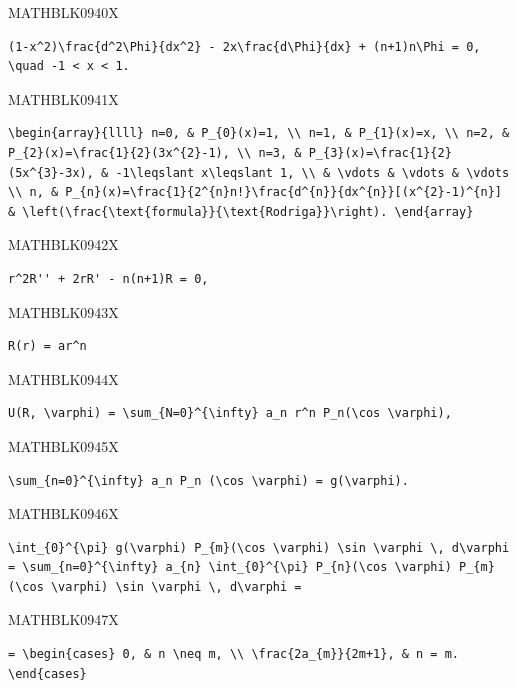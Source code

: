 \documentclass[
  ukrainian,
]{article}
\begin{document}
MATHBLK0940X

\begin{verbatim}
(1-x^2)\frac{d^2\Phi}{dx^2} - 2x\frac{d\Phi}{dx} + (n+1)n\Phi = 0, \quad -1 < x < 1.
\end{verbatim}

MATHBLK0941X

\begin{verbatim}
\begin{array}{llll} n=0, & P_{0}(x)=1, \\ n=1, & P_{1}(x)=x, \\ n=2, & P_{2}(x)=\frac{1}{2}(3x^{2}-1), \\ n=3, & P_{3}(x)=\frac{1}{2}(5x^{3}-3x), & -1\leqslant x\leqslant 1, \\ & \vdots & \vdots & \vdots \\ n, & P_{n}(x)=\frac{1}{2^{n}n!}\frac{d^{n}}{dx^{n}}[(x^{2}-1)^{n}] & \left(\frac{\text{formula}}{\text{Rodriga}}\right). \end{array}
\end{verbatim}

MATHBLK0942X

\begin{verbatim}
r^2R'' + 2rR' - n(n+1)R = 0,
\end{verbatim}

MATHBLK0943X

\begin{verbatim}
R(r) = ar^n
\end{verbatim}

MATHBLK0944X

\begin{verbatim}
U(R, \varphi) = \sum_{N=0}^{\infty} a_n r^n P_n(\cos \varphi),
\end{verbatim}

MATHBLK0945X

\begin{verbatim}
\sum_{n=0}^{\infty} a_n P_n (\cos \varphi) = g(\varphi).
\end{verbatim}

MATHBLK0946X

\begin{verbatim}
\int_{0}^{\pi} g(\varphi) P_{m}(\cos \varphi) \sin \varphi \, d\varphi = \sum_{n=0}^{\infty} a_{n} \int_{0}^{\pi} P_{n}(\cos \varphi) P_{m}(\cos \varphi) \sin \varphi \, d\varphi =
\end{verbatim}

MATHBLK0947X

\begin{verbatim}
= \begin{cases} 0, & n \neq m, \\ \frac{2a_{m}}{2m+1}, & n = m. \end{cases}
\end{verbatim}
\end{document}
